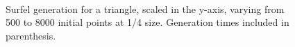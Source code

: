 \begin{figure}[h!]
   \\
   \captionfonts
   \caption[Triangle surfels at quarter size]{Surfel generation for a triangle, scaled in the y-axis, varying from 500 to 8000 initial points at 1/4 size. Generation times included in parenthesis.}
   \label{fig:small_triangle_surfels}
\end{figure}

